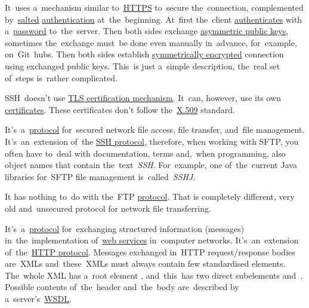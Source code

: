It~uses a~mechanism similar to~\hyperref[https]{HTTPS} to~secure the~connection, complemented by~\hyperref[salt]{salted} \hyperref[authenticationauthorization]{authentication} at~the~beginning.
At~first the~client \hyperref[authenticationauthorization]{authenticates} with a~\hyperref[keypassword]{password} to~the~server.
Then both sides exchange \hyperref[asymmetriccryptography]{asymmetric public keys}, sometimes the~exchange must~be done even manually in~advance, for~example, on~Git~hubs.
Then both sides establish \hyperref[symmetriccryptography]{symmetrically encrypted} connection using exchanged public keys.
This~is just a~simple description, the~real set of~steps is~rather complicated.

SSH~doesn't use \hyperref[tls]{TLS certification mechanism}.
It~can, however, use its own \hyperref[certificate]{certificates}.
These certificates don't follow the~\hyperref[x509]{\mbox{X.509}} standard.

\label{sftp}
It's~a~\hyperref[protocolstandard]{protocol} for~secured network file access, file transfer, and~file management.
It's~an~extension of~the \hyperref[ssh]{SSH protocol}, therefore, when working with SFTP, you often have to~deal with documentation, terms and,~when programming, also object names that contain the~text~\textit{SSH}.
For~example, one of~the~current Java libraries for~SFTP file management is~called~\textit{SSHJ}.

\warning It has nothing to~do with the~FTP \hyperref[protocolstandard]{protocol}.
That is completely different, very old and~unsecured protocol for network file transferring.

\label{soap}
It's~a~\hyperref[protocolstandard]{protocol} for~exchanging structured information (messages) in~the~implementation of~\hyperref[webserviceapplication]{web services} in~computer networks.
It's~an~extension of~the~\hyperref[http]{HTTP protocol}.
Messages exchanged in~HTTP request/response bodies are~XMLs and~these~XMLs must always contain few standardised elements.
The~whole XML has a~root element , and~this~has two direct subelements  \mbox{and }.
Possible contents of~the~header and~the~body are~described by \mbox{a server's \hyperref[wsdl]{WSDL}}.
